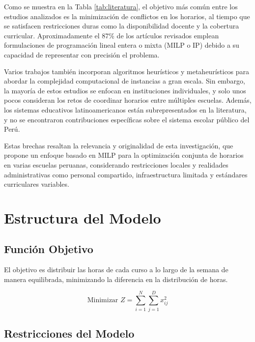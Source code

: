 \documentclass[12pt]{article}
\begin{document}
Como se muestra en la Tabla \ref{tab:literatura}, el objetivo más común entre los estudios analizados es la minimización de conflictos en los horarios, al tiempo que se satisfacen restricciones duras como la disponibilidad docente y la cobertura curricular. Aproximadamente el 87\% de los artículos revisados emplean formulaciones de programación lineal entera o mixta (MILP o IP) debido a su capacidad de representar con precisión el problema.

Varios trabajos también incorporan algoritmos heurísticos y metaheurísticos para abordar la complejidad computacional de instancias a gran escala. Sin embargo, la mayoría de estos estudios se enfocan en instituciones individuales, y solo unos pocos consideran los retos de coordinar horarios entre múltiples escuelas. Además, los sistemas educativos latinoamericanos están subrepresentados en la literatura, y no se encontraron contribuciones específicas sobre el sistema escolar público del Perú.

Estas brechas resaltan la relevancia y originalidad de esta investigación, que propone un enfoque basado en MILP para la optimización conjunta de horarios en varias escuelas peruanas, considerando restricciones locales y realidades administrativas como personal compartido, infraestructura limitada y estándares curriculares variables.


\section{Estructura del Modelo}

\subsection{Función Objetivo}
El objetivo es distribuir las horas de cada curso a lo largo de la semana de manera equilibrada, minimizando la diferencia en la distribución de horas.

\begin{equation}
\text{Minimizar } Z = \sum_{i=1}^{N} \sum_{j=1}^{D} x_{ij}^2
\end{equation}

\subsection{Restricciones del Modelo}
\end{document}
